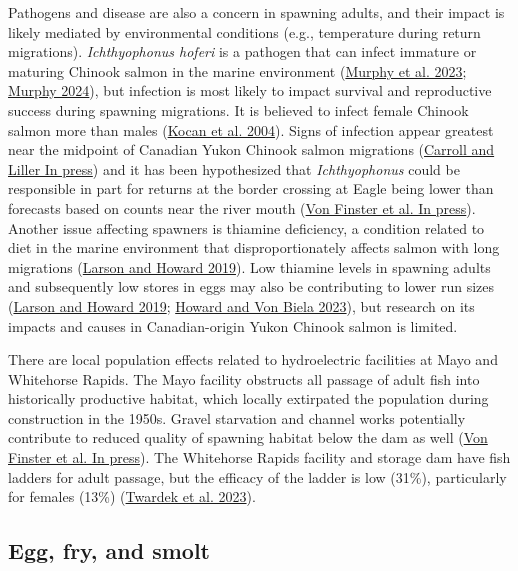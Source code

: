 \documentclass[11pt]{book}
\begin{document}
Pathogens and disease are also a concern in spawning adults, and their impact is likely mediated by environmental conditions (e.g., temperature during return migrations). \emph{Ichthyophonus hoferi} is a pathogen that can infect immature or maturing Chinook salmon in the marine environment (\protect\hyperlink{ref-murphy2023}{Murphy et al. 2023}; \protect\hyperlink{ref-murphy2024_youtube}{Murphy 2024}), but infection is most likely to impact survival and reproductive success during spawning migrations. It is believed to infect female Chinook salmon more than males (\protect\hyperlink{ref-kocan2004}{Kocan et al. 2004}). Signs of infection appear greatest near the midpoint of Canadian Yukon Chinook salmon migrations (\protect\hyperlink{ref-carroll2023}{Carroll and Liller In press}) and it has been hypothesized that \emph{Ichthyophonus} could be responsible in part for returns at the border crossing at Eagle being lower than forecasts based on counts near the river mouth (\protect\hyperlink{ref-vonfinster}{Von Finster et al. In press}). Another issue affecting spawners is thiamine deficiency, a condition related to diet in the marine environment that disproportionately affects salmon with long migrations (\protect\hyperlink{ref-larson2019}{Larson and Howard 2019}). Low thiamine levels in spawning adults and subsequently low stores in eggs may also be contributing to lower run sizes (\protect\hyperlink{ref-larson2019}{Larson and Howard 2019}; \protect\hyperlink{ref-howard2023}{Howard and Von Biela 2023}), but research on its impacts and causes in Canadian-origin Yukon Chinook salmon is limited.

There are local population effects related to hydroelectric facilities at Mayo and Whitehorse Rapids. The Mayo facility obstructs all passage of adult fish into historically productive habitat, which locally extirpated the population during construction in the 1950s. Gravel starvation and channel works potentially contribute to reduced quality of spawning habitat below the dam as well (\protect\hyperlink{ref-vonfinster}{Von Finster et al. In press}). The Whitehorse Rapids facility and storage dam have fish ladders for adult passage, but the efficacy of the ladder is low (31\%), particularly for females (13\%) (\protect\hyperlink{ref-twardek2023}{Twardek et al. 2023}).

\hypertarget{egg-fry-and-smolt}{%
\subsection{Egg, fry, and smolt}\label{egg-fry-and-smolt}}
\end{document}
